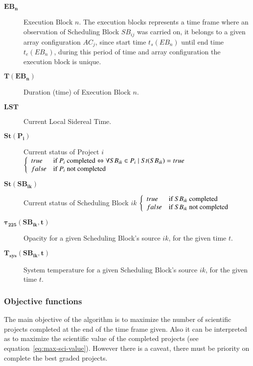 \begin{description}
\item[$\mathbf{EB_n}$] Execution Block $n$. The execution blocks represents a time frame where an observation of Scheduling Block $SB_{ij}$ was carried on, it belongs to a given array configuration $AC_j $, since start time $t_s(EB_n)$ until end time $t_e(EB_n)$, during this period of time and array configuration the execution block is unique.

\item[$\mathbf{T(EB_n)}$] Duration (time) of Execution Block $n$.

\item[$\mathbf{LST}$] Current Local Sidereal Time.

\item[$\mathbf{St(P_i)}$] Current status of Project $i$  $
\left\{
\begin{array}{l l} 
true & \mbox{if  } P_i \mbox{ completed} \Leftrightarrow \forall SB_{ik} \in P_i \mid St(SB_{ik}) = true\\
false & \mbox{if  } P_i \mbox{ not completed} \\
\end{array}
\right .$

\item[$\mathbf{St(SB_{ik})}$] Current status of Scheduling Block $ik$  $
\left\{
\begin{array}{l l} 
true & \mbox{if  } SB_{ik} \mbox{ completed} \\
false & \mbox{if  } SB_{ik} \mbox{ not completed} \\
\end{array}
\right .$

\item[$\mathbf{\tau_{225}(SB_{ik}, t)}$] Opacity for a given Scheduling Block's source $ik$, for the given time $t$.

\item[$\mathbf{T_{sys}(SB_{ik}, t)}$] System temperature for a given Scheduling Block's source $ik$, for the given time $t$.

\end{description}

\subsubsection{Objective functions}

The main objective of the algorithm is to maximize the number of scientific projects completed at the end of the time frame given. Also it can be interpreted as to maximize the scientific value of the completed projects (see equation~\ref{eq:max-sci-value}). However there is a caveat, there must be priority on complete the best graded projects.

